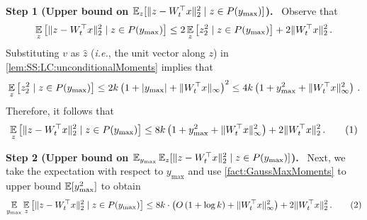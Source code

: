 \documentclass[11pt,letterpaper]{article}
\theoremstyle{plain}
\theoremstyle{definition}
\theoremstyle{remark}
\newcommand{\yesnum}{\addtocounter{equation}{1}\tag{\theequation}}
\def\abs#1{\left| #1 \right|}
\newcommand{\sinsquare}[1]{\ensuremath{[#1]}}
\newcommand{\inparen}[1]{\ensuremath{\left(#1\right)}}
\newcommand{\insquare}[1]{\ensuremath{\left[#1\right]}}
\newcommand{\snorm}[1]{\ensuremath{\ensuremath{\| #1 \|}}}
\let\norm\relax
\newcommand{\norm}[1]{\ensuremath{\left\lVert #1 \right\rVert}}
\newcommand{\E}{\operatornamewithlimits{\mathbb{E}}}
\newcommand{\Ex}{\E}
\newcommand{\wh}[1]{\widehat{#1}}
\renewcommand{\paragraph}[1]{\medskip \noindent\textbf{#1}~}
\newcommand{\ie}{\emph{i.e.}}
\newcommand{\ymax}{y_{\max}}
\begin{document}
{{        \paragraph{Step 1 (Upper bound on $\Ex_z\sinsquare{
            \snorm{z - W_t^\top x}_2^2  \mid z\in P(\ymax)
        }$).}
            Observe that 
            \[
                \Ex_z\insquare{
                    \snorm{z - W_t^\top x}_2^2  \mid z\in P(\ymax)
                }
                \leq 
                2\Ex_z\insquare{
                    \norm{z}_2^2 \mid z\in P(\ymax)
                }
                + 2 \snorm{W_t^\top x}_2^2  \,.
            \]
            Substituting $v$ as $\wh{z}$ (\ie{}, the unit vector along $z$) in \cref{lem:SS:LC:unconditionalMoments} implies that 
            \[
                \Ex_z\insquare{
                    \norm{z}_2^2 \mid z\in P(\ymax)
                }\leq 
                    2k \inparen{1+\abs{\ymax} + \snorm{W_t^\top x}_\infty}^2
                    \leq 4k \inparen{1+\ymax^2 + \snorm{W_t^\top x}_\infty^2}
                    \,.
            \]
            Therefore, it follows that
            \[
                \Ex_z\insquare{
                    \snorm{z - W_t^\top x}_2^2  \mid z\in P(\ymax)
                }
                \leq 
                8k\inparen{1+{\ymax^2} + \snorm{W_t^\top x}_\infty^2}
                + 2 \snorm{W_t^\top x}_2^2  \,.
                \yesnum\label{eq:SS:secondMoment:ub1}
            \]

        \paragraph{Step 2 (Upper bound on $\Ex_{\ymax}\Ex_z[\snorm{z - W_t^\top x}_2^2 \mid z\in P(\ymax)]$).}
            Next, we take the expectation with respect to $\ymax$ and use \cref{fact:GaussMaxMoments} to upper bound $\Ex[\ymax^2]$ to obtain 
            \[
                \Ex_{\ymax}
                \Ex_z\insquare{
                    \snorm{z - W_t^\top x}_2^2  \mid z\in P(\ymax)
                }
                \leq 
                8k\cdot \inparen{
                    O\inparen{1 + \log{k}}
                    +\snorm{W_t^\top x}_\infty^2
                 }
                + 2 \snorm{W_t^\top x}_2^2  \,.
                \yesnum\label{eq:SS:SecondMoment:1}
            \]


}}
\end{document}
